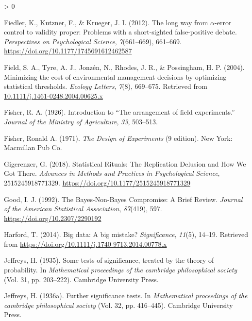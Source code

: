 \documentclass[
  english,
  ,man, a4paper,floatsintext]{apa6}
\newlength{\cslhangindent}
\newenvironment{CSLReferences}[2] %
 {%
  \setlength{\parindent}{0pt}
  \ifodd #1 \everypar{\setlength{\hangindent}{\cslhangindent}}\ignorespaces\fi
  \ifnum #2 > 0
  \setlength{\parskip}{#2\baselineskip}
  \fi
 }%
 {}
\begin{document}
\begin{CSLReferences}{1}{0}
\leavevmode\hypertarget{ref-fiedler_long_2012}{}%
Fiedler, K., Kutzner, F., \& Krueger, J. I. (2012). The long way from {\(\alpha\)}-error control to validity proper: {Problems with} a short-sighted false-positive debate. \emph{Perspectives on Psychological Science}, \emph{7}(661--669), 661--669. \url{https://doi.org/10.1177/1745691612462587}

\leavevmode\hypertarget{ref-field_minimizing_2004}{}%
Field, S. A., Tyre, A. J., Jonzén, N., Rhodes, J. R., \& Possingham, H. P. (2004). Minimizing the cost of environmental management decisions by optimizing statistical thresholds. \emph{Ecology Letters}, \emph{7}(8), 669--675. Retrieved from \href{https://10.1111/j.1461-0248.2004.00625.x}{10.1111/j.1461-0248.2004.00625.x}

\leavevmode\hypertarget{ref-fisher_introduction_1926}{}%
Fisher, R. A. (1926). Introduction to {``{The} arrangement of field experiments.''} \emph{Journal of the Ministry of Agriculture}, \emph{33}, 503--513.

\leavevmode\hypertarget{ref-fisher_design_1971}{}%
Fisher, Ronald A. (1971). \emph{The {Design} of {Experiments}} (9 edition). New York: Macmillan Pub Co.

\leavevmode\hypertarget{ref-gigerenzer_statistical_2018}{}%
Gigerenzer, G. (2018). Statistical {Rituals}: {The Replication Delusion} and {How We Got There}. \emph{Advances in Methods and Practices in Psychological Science}, 2515245918771329. \url{https://doi.org/10.1177/2515245918771329}

\leavevmode\hypertarget{ref-good_bayes-non-bayes_1992}{}%
Good, I. J. (1992). The {Bayes}-{Non}-{Bayes Compromise}: {A Brief Review}. \emph{Journal of the American Statistical Association}, \emph{87}(419), 597. \url{https://doi.org/10.2307/2290192}

\leavevmode\hypertarget{ref-harford2014big}{}%
Harford, T. (2014). Big data: A big mistake? \emph{Significance}, \emph{11}(5), 14--19. Retrieved from \url{https://doi.org/10.1111/j.1740-9713.2014.00778.x}

\leavevmode\hypertarget{ref-jeffreys1935some}{}%
Jeffreys, H. (1935). Some tests of significance, treated by the theory of probability. In \emph{Mathematical proceedings of the cambridge philosophical society} (Vol. 31, pp. 203--222). Cambridge University Press.

\leavevmode\hypertarget{ref-jeffreys1936further}{}%
Jeffreys, H. (1936a). Further significance tests. In \emph{Mathematical proceedings of the cambridge philosophical society} (Vol. 32, pp. 416--445). Cambridge University Press.


\end{CSLReferences}
\end{document}
